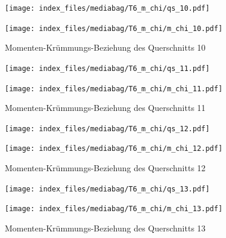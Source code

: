 \documentclass[
  11pt,
  letterpaper,
]{scrreprt}
\begin{document}
\begin{figure}[H]

\begin{minipage}{0.50\linewidth}
\texttt{[image: index\_files/mediabag/T6\_m\_chi/qs\_10.pdf]}\end{minipage}%
%
\begin{minipage}{0.50\linewidth}
\texttt{[image: index\_files/mediabag/T6\_m\_chi/m\_chi\_10.pdf]}\end{minipage}%

\caption{\label{fig-mchi_anhang}Momenten-Krümmungs-Beziehung des
Querschnitts 10}

\end{figure}%

\begin{figure}[H]

\begin{minipage}{0.50\linewidth}
\texttt{[image: index\_files/mediabag/T6\_m\_chi/qs\_11.pdf]}\end{minipage}%
%
\begin{minipage}{0.50\linewidth}
\texttt{[image: index\_files/mediabag/T6\_m\_chi/m\_chi\_11.pdf]}\end{minipage}%

\caption{\label{fig-mchi_anhang}Momenten-Krümmungs-Beziehung des
Querschnitts 11}

\end{figure}%

\begin{figure}[H]

\begin{minipage}{0.50\linewidth}
\texttt{[image: index\_files/mediabag/T6\_m\_chi/qs\_12.pdf]}\end{minipage}%
%
\begin{minipage}{0.50\linewidth}
\texttt{[image: index\_files/mediabag/T6\_m\_chi/m\_chi\_12.pdf]}\end{minipage}%

\caption{\label{fig-mchi_anhang}Momenten-Krümmungs-Beziehung des
Querschnitts 12}

\end{figure}%

\begin{figure}[H]

\begin{minipage}{0.50\linewidth}
\texttt{[image: index\_files/mediabag/T6\_m\_chi/qs\_13.pdf]}\end{minipage}%
%
\begin{minipage}{0.50\linewidth}
\texttt{[image: index\_files/mediabag/T6\_m\_chi/m\_chi\_13.pdf]}\end{minipage}%

\caption{\label{fig-mchi_anhang}Momenten-Krümmungs-Beziehung des
Querschnitts 13}

\end{figure}%
\end{document}
